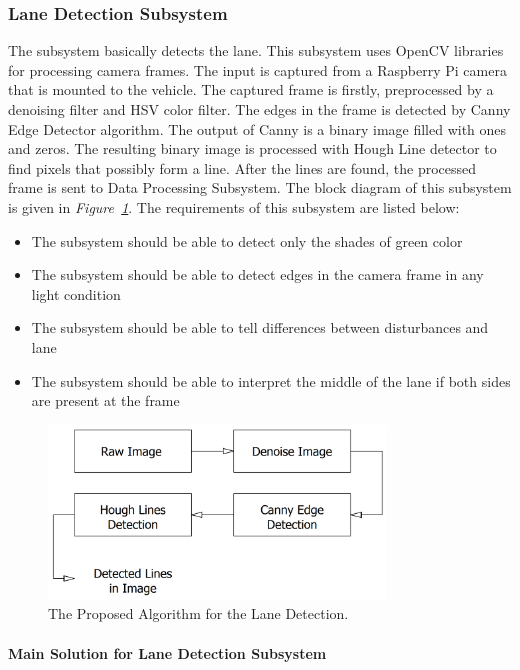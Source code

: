 \documentclass[a4paper,12pt]{article}
\begin{document}
	
	\subsubsection{Lane Detection Subsystem}
	The subsystem basically detects the lane. This subsystem uses OpenCV libraries for processing camera frames. The input is captured from a Raspberry Pi camera that is mounted to the vehicle. The captured frame is firstly, preprocessed by a denoising filter and HSV color filter. The edges in the frame is detected by Canny Edge Detector algorithm. The output of Canny is a binary image filled with ones and zeros. The resulting binary image is processed with Hough Line detector to find pixels that possibly form a line. After the lines are found, the processed frame is sent to Data Processing Subsystem. The block diagram of this subsystem is given in \textit{Figure~\ref{fig:lane_detection_subsystem}}. The requirements of this subsystem are listed below:
	\begin{itemize}
		\item The subsystem should be able to detect only the shades of green color
		\item The subsystem should be able to detect edges in the camera frame in any light condition
		\item The subsystem should be able to tell differences between disturbances and lane
		\item The subsystem should be able to interpret the middle of the lane if both sides are present at the frame
	\end{itemize}
	
	\begin{figure}[h]
		\center
		\setlength{\unitlength}{\textwidth} 
		\includegraphics[width=0.8\textwidth]{v-models/lane_detection_subsystem}
		\caption{\label{fig:lane_detection_subsystem}The Proposed Algorithm for the Lane Detection.}
	\end{figure}
	
	\paragraph{Main Solution for Lane Detection Subsystem}
		
\end{document}
